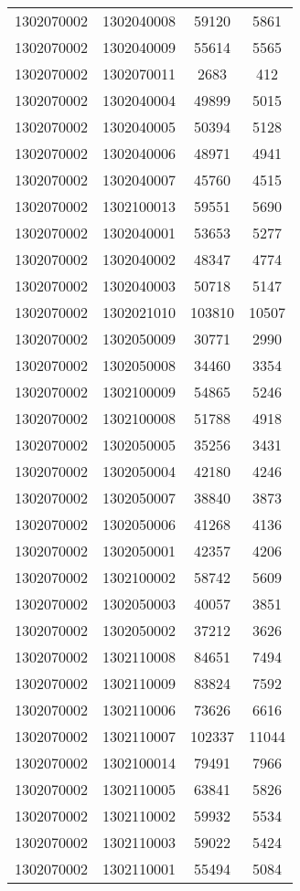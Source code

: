 \begin{longtable}{llcc}
1302070002 & 1302040008 & 59120 & 5861\\
1302070002 & 1302040009 & 55614 & 5565\\
1302070002 & 1302070011 & 2683 & 412\\
1302070002 & 1302040004 & 49899 & 5015\\
1302070002 & 1302040005 & 50394 & 5128\\
1302070002 & 1302040006 & 48971 & 4941\\
1302070002 & 1302040007 & 45760 & 4515\\
1302070002 & 1302100013 & 59551 & 5690\\
1302070002 & 1302040001 & 53653 & 5277\\
1302070002 & 1302040002 & 48347 & 4774\\
1302070002 & 1302040003 & 50718 & 5147\\
1302070002 & 1302021010 & 103810 & 10507\\
1302070002 & 1302050009 & 30771 & 2990\\
1302070002 & 1302050008 & 34460 & 3354\\
1302070002 & 1302100009 & 54865 & 5246\\
1302070002 & 1302100008 & 51788 & 4918\\
1302070002 & 1302050005 & 35256 & 3431\\
1302070002 & 1302050004 & 42180 & 4246\\
1302070002 & 1302050007 & 38840 & 3873\\
1302070002 & 1302050006 & 41268 & 4136\\
1302070002 & 1302050001 & 42357 & 4206\\
1302070002 & 1302100002 & 58742 & 5609\\
1302070002 & 1302050003 & 40057 & 3851\\
1302070002 & 1302050002 & 37212 & 3626\\
1302070002 & 1302110008 & 84651 & 7494\\
1302070002 & 1302110009 & 83824 & 7592\\
1302070002 & 1302110006 & 73626 & 6616\\
1302070002 & 1302110007 & 102337 & 11044\\
1302070002 & 1302100014 & 79491 & 7966\\
1302070002 & 1302110005 & 63841 & 5826\\
1302070002 & 1302110002 & 59932 & 5534\\
1302070002 & 1302110003 & 59022 & 5424\\
1302070002 & 1302110001 & 55494 & 5084\\

\end{longtable}
